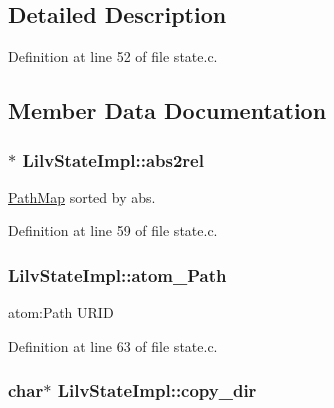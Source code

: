 \subsection{Detailed Description}


Definition at line 52 of file state.\+c.



\subsection{Member Data Documentation}
\subsubsection[{\texorpdfstring{abs2rel}{abs2rel}}]{$\ast$ Lilv\+State\+Impl\+::abs2rel}\hypertarget{struct_lilv_state_impl_a2127bb9abaaae47123138fbd22edc8e5}{}\label{struct_lilv_state_impl_a2127bb9abaaae47123138fbd22edc8e5}


\hyperlink{struct_path_map}{Path\+Map} sorted by abs. 



Definition at line 59 of file state.\+c.

\subsubsection[{\texorpdfstring{atom\+\_\+\+Path}{atom_Path}}]{ Lilv\+State\+Impl\+::atom\+\_\+\+Path}\hypertarget{struct_lilv_state_impl_a59aa18aaedef6f9c00bac6e46c04c150}{}\label{struct_lilv_state_impl_a59aa18aaedef6f9c00bac6e46c04c150}


atom\+:Path U\+R\+ID 



Definition at line 63 of file state.\+c.

\subsubsection[{\texorpdfstring{copy\+\_\+dir}{copy_dir}}]{\setlength{\rightskip}{0pt plus 5cm}char$\ast$ Lilv\+State\+Impl\+::copy\+\_\+dir}\hypertarget{struct_lilv_state_impl_a92a6b22fb006586f698c99c1d3b72459}{}\label{struct_lilv_state_impl_a92a6b22fb006586f698c99c1d3b72459}



